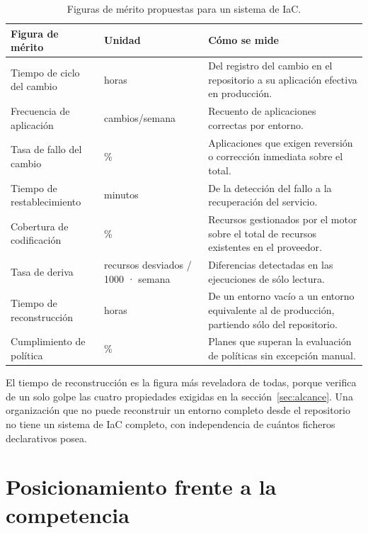 \documentclass[11pt,letterpaper]{article}
\begin{document}
\begin{table}[ht]
  \centering
  \footnotesize
  \caption{Figuras de mérito propuestas para un sistema de IaC.}
  \label{tab:fom}
  \begin{tabularx}{\textwidth}{@{}>{\raggedright\arraybackslash}p{}
    >{\raggedright\arraybackslash}p{}
    >{\raggedright\arraybackslash}X@{}}
    \toprule
    \textbf{Figura de mérito} & \textbf{Unidad} & \textbf{Cómo se mide} \\
    \midrule
    Tiempo de ciclo del cambio & horas & Del registro del cambio en el
      repositorio a su aplicación efectiva en producción. \\
    Frecuencia de aplicación & cambios/semana & Recuento de aplicaciones
      correctas por entorno. \\
    Tasa de fallo del cambio & \% & Aplicaciones que exigen reversión o
      corrección inmediata sobre el total. \\
    Tiempo de restablecimiento & minutos & De la detección del fallo a la
      recuperación del servicio. \\
    Cobertura de codificación & \% & Recursos gestionados por el motor sobre
      el total de recursos existentes en el proveedor. \\
    Tasa de deriva & recursos desviados / 1000 · semana & Diferencias
      detectadas en las ejecuciones de sólo lectura. \\
    Tiempo de reconstrucción & horas & De un entorno vacío a un entorno
      equivalente al de producción, partiendo sólo del repositorio. \\
    Cumplimiento de política & \% & Planes que superan la evaluación de
      políticas sin excepción manual. \\
    \bottomrule
  \end{tabularx}
\end{table}

El tiempo de reconstrucción es la figura más reveladora de todas, porque
verifica de un solo golpe las cuatro propiedades exigidas en la
sección~\ref{sec:alcance}. Una
organización que no puede reconstruir un entorno completo desde el repositorio
no tiene un sistema de IaC completo, con independencia de cuántos ficheros
declarativos posea.

\section{Posicionamiento frente a la competencia}
\label{sec:comp}
\end{document}
